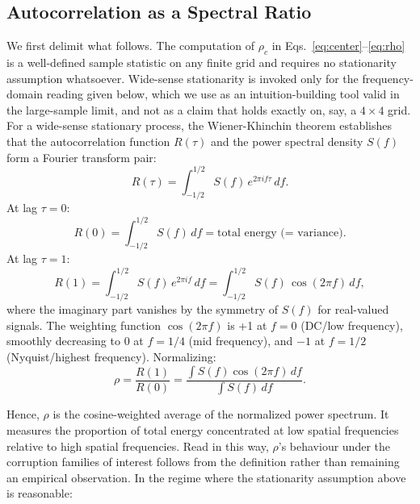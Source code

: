\documentclass{bmvc2k}
\begin{document}
\subsection{Autocorrelation as a Spectral Ratio}\label{spectral}
We first delimit what follows. The computation of $\rho_c$ in Eqs.~\ref{eq:center}--\ref{eq:rho} is a well-defined sample statistic on any finite grid and requires no stationarity assumption whatsoever. Wide-sense stationarity is invoked only for the frequency-domain reading given below, which we use as an intuition-building tool valid in the large-sample limit, and not as a claim that holds exactly on, say, a $4\times4$ grid.
For a wide-sense stationary process, the Wiener-Khinchin theorem establishes that the autocorrelation function $R(\tau)$ and the power spectral density $S(f)$ form a Fourier transform pair:
\begin{equation}\label{eq:wk}
    R(\tau) = \int_{-1/2}^{1/2} S(f)\, e^{2\pi i f \tau}\, df.
\end{equation}
At lag $\tau = 0$:
\begin{equation}\label{eq:r0}
    R(0) = \int_{-1/2}^{1/2} S(f)\, df = \text{total energy (= variance)}.
\end{equation}
At lag $\tau = 1$:
\begin{equation}\label{eq:r1}
    R(1) = \int_{-1/2}^{1/2} S(f)\, e^{2\pi i f}\, df = \int_{-1/2}^{1/2} S(f)\,\cos(2\pi f)\, df,
\end{equation}
where the imaginary part vanishes by the symmetry of $S(f)$ for real-valued signals. The weighting function $\cos(2\pi f)$ is +1 at $f = 0$ (DC/low frequency), smoothly decreasing to 0 at $f = 1/4$ (mid frequency), and $-1$ at $f = 1/2$ (Nyquist/highest frequency). Normalizing:
\begin{equation}\label{eq:rho_spectral}
    \rho = \frac{R(1)}{R(0)} = \frac{\int S(f)\cos(2\pi f)\,df}{\int S(f)\,df}.
\end{equation}

Hence, $\rho$ is the cosine-weighted average of the normalized power spectrum. It measures the proportion of total energy concentrated at low spatial frequencies relative to high spatial frequencies. Read in this way, $\rho$'s behaviour under the corruption families of interest follows from the definition rather than remaining an empirical observation. In the regime where the stationarity assumption above is reasonable:
\end{document}
